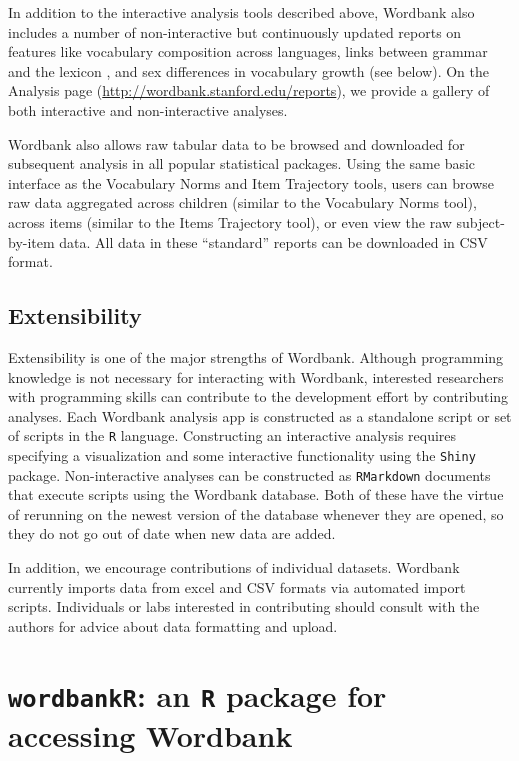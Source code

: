 \documentclass[doc,noapacite]{apa2}
\begin{document}
In addition to the interactive analysis tools described above, Wordbank also includes a number of non-interactive but continuously updated reports on features like vocabulary composition across languages, links between grammar and the lexicon \cite{braginsky2015}, and sex differences in vocabulary growth (see below). On the Analysis page (\url{http://wordbank.stanford.edu/reports}), we provide a gallery of both interactive and non-interactive analyses. 

Wordbank also allows raw tabular data to be browsed and downloaded for subsequent analysis in all popular statistical packages. Using the same basic interface as the Vocabulary Norms and Item Trajectory tools, users can browse raw data aggregated across children (similar to the Vocabulary Norms tool), across items (similar to the Items Trajectory tool), or even view the raw subject-by-item data. All data in these ``standard'' reports can be downloaded in CSV format. 

\subsection{Extensibility}

Extensibility is one of the major strengths of Wordbank. Although programming knowledge is not necessary for interacting with Wordbank, interested researchers with programming skills can contribute to the development effort by contributing analyses. Each Wordbank analysis app is constructed as a standalone script or set of scripts in the \texttt{R} language. Constructing an interactive analysis requires specifying a visualization and some interactive functionality using the \texttt{Shiny} package. Non-interactive analyses can be constructed as \texttt{RMarkdown} documents that execute scripts using the Wordbank database. Both of these have the virtue of rerunning on the newest version of the database whenever they are opened, so they do not go out of date when new data are added. 

In addition, we encourage contributions of individual datasets. Wordbank currently imports data from excel and CSV formats via automated import scripts. Individuals or labs interested in contributing should consult with the authors for advice about data formatting and upload. 

\section{\texttt{wordbankR}: an \texttt{R} package for accessing Wordbank}
\end{document}
